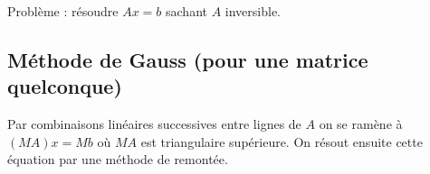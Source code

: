 Problème : résoudre $Ax = b$ sachant $A$ inversible.

\subsection{Méthode de Gauss (pour une matrice quelconque)}

	Par combinaisons linéaires successives entre lignes de $A$ on se ramène à $(MA)x = Mb$ où $MA$ est triangulaire supérieure.
	On résout ensuite cette équation par une méthode de remontée.
	
	
